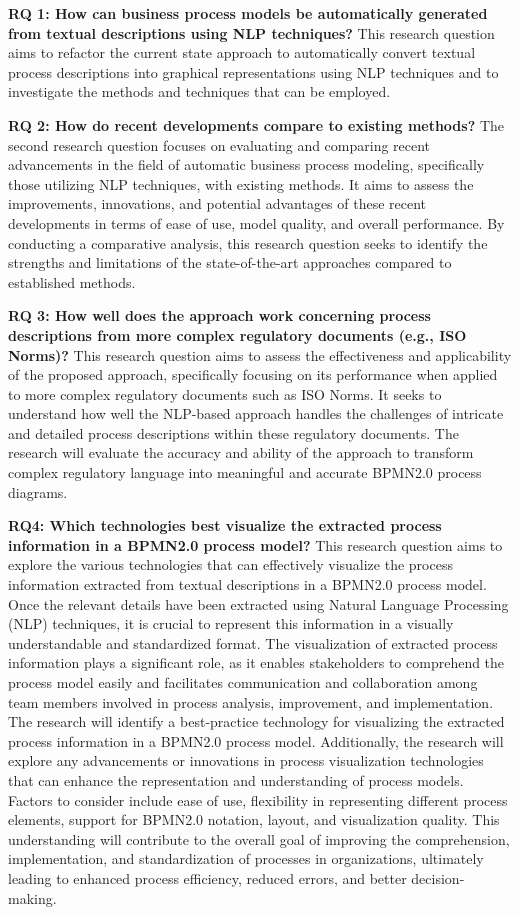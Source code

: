 \textbf{RQ 1: How can business process models be automatically generated from textual descriptions using NLP techniques? }This research question aims to refactor the current state approach to automatically convert textual process descriptions into graphical representations using NLP techniques and to investigate the methods and techniques that can be employed. 

\textbf{RQ 2: How do recent developments compare to existing methods? }The second research question focuses on evaluating and comparing recent advancements in the field of automatic business process modeling, specifically those utilizing NLP techniques, with existing methods. It aims to assess the improvements, innovations, and potential advantages of these recent developments in terms of ease of use, model quality, and overall performance. By conducting a comparative analysis, this research question seeks to identify the strengths and limitations of the state-of-the-art approaches compared to established methods. 

\textbf{RQ 3: How well does the approach work concerning process descriptions from more complex regulatory documents (e.g., ISO Norms)? }This research question aims to assess the effectiveness and applicability of the proposed approach, specifically focusing on its performance when applied to more complex regulatory documents such as ISO Norms. It seeks to understand how well the NLP-based approach handles the challenges of intricate and detailed process descriptions within these regulatory documents. The research will evaluate the accuracy and ability of the approach to transform complex regulatory language into meaningful and accurate BPMN2.0 process diagrams. 

\textbf{RQ4: Which technologies best visualize the extracted process information in a BPMN2.0 process model?} This research question aims to explore the various technologies that can effectively visualize the process information extracted from textual descriptions in a BPMN2.0 process model. Once the relevant details have been extracted using Natural Language Processing (NLP) techniques, it is crucial to represent this information in a visually understandable and standardized format. The visualization of extracted process information plays a significant role, as it enables stakeholders to comprehend the process model easily and facilitates communication and collaboration among team members involved in process analysis, improvement, and implementation. The research will identify a best-practice technology for visualizing the extracted process information in a BPMN2.0 process model. Additionally, the research will explore any advancements or innovations in process visualization technologies that can enhance the representation and understanding of process models. Factors to consider include ease of use, flexibility in representing different process elements, support for BPMN2.0 notation, layout, and visualization quality. This understanding will contribute to the overall goal of improving the comprehension, implementation, and standardization of processes in organizations, ultimately leading to enhanced process efficiency, reduced errors, and better decision-making.
\pagebreak

